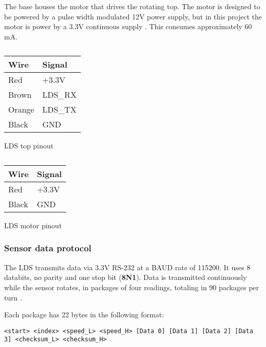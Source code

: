 \documentclass[Main]{subfiles}
\begin{document}
		The base houses the motor that drives the rotating top.
		The motor is designed to be powered by a pulse width modulated  12V power supply, but in this project the motor is power by a 3.3V continuous supply .
		This consumes approximately 60 mA.

		\begin{table}[h]
			\begin{subtable}[b]{0.5\linewidth}
				\centering
					\begin{tabular}{|l|l|}
					\hline
					{\bf Wire} & {\bf Signal} \\ \hline
					Red        & +3.3V        \\ \hline
					Brown      & LDS\_RX      \\ \hline
					Orange     & LDS\_TX      \\ \hline
					Black      & GND          \\ \hline
				\end{tabular}
				\caption{LDS top pinout}
				\label{tab:lds_top}
			\end{subtable}
			\begin{subtable}[b]{0.5\linewidth}
				\centering
				\begin{tabular}{|l|l|}
					\hline
					{\bf Wire} & {\bf Signal} \\ \hline
					Red        & +3.3V        \\ \hline
					Black      & GND          \\ \hline
				\end{tabular}
				\caption{LDS motor pinout}
				\label{tab:lds_motor}
			\end{subtable}
			\caption{}
		\end{table}


		\subsubsection{Sensor data protocol} %
		\label{ssub:sensor_communication_protocol}
			The LDS transmits data via 3.3V RS-232 at a BAUD rate of 115200.
			It uses 8 databits, no parity and one stop bit (\textbf{8N1}).
			Data is transmitted continuously while the sensor rotates, in packages of four readings, totaling in 90 packages per turn \cite{OpenSource}.

			Each package has 22 bytes in the following format:

			{\footnotesize\texttt{<start> <index> <speed\_L> <speed\_H> [Data 0] [Data 1] [Data 2] [Data 3] <checksum\_L> <checksum\_H>}}
\end{document}
